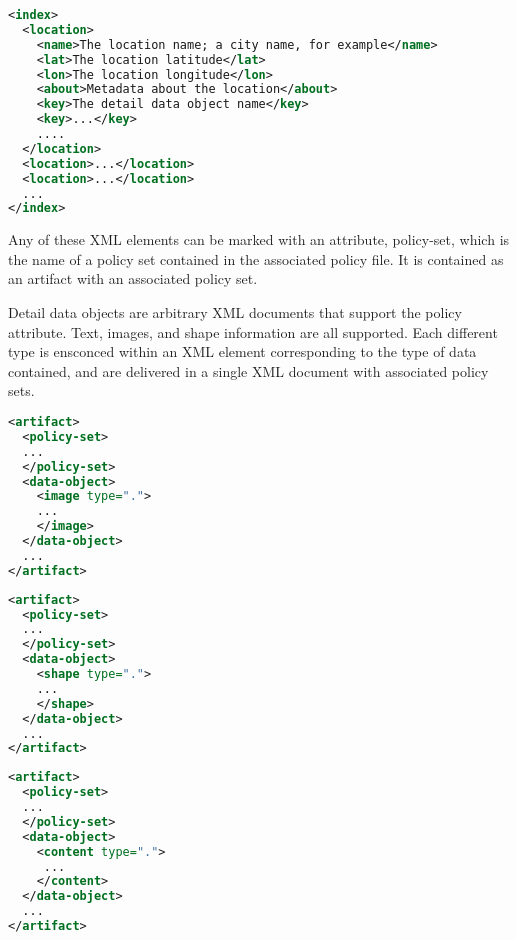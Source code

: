 \begin{lstlisting}[language=xml, label=lst:seed-data, caption=Seed Information for the Network]
<index>
  <location>
    <name>The location name; a city name, for example</name>
    <lat>The location latitude</lat>
    <lon>The location longitude</lon>
    <about>Metadata about the location</about>
    <key>The detail data object name</key>
    <key>...</key>
    ....
  </location>
  <location>...</location>
  <location>...</location>
  ...
</index>
\end{lstlisting}

Any of these XML elements can be marked with an attribute, policy-set, which is the name of a policy set contained in the associated policy file.  It is contained as an artifact with an associated policy set.

Detail data objects are arbitrary XML documents that support the policy attribute.  Text, images, and shape information are all supported.  Each different type is ensconced within an XML element corresponding to the type of data contained, and are delivered in a single XML document with associated policy sets.


\par\noindent
\begin{minipage}[t]{.30\textwidth}
\begin{lstlisting}[language=xml, label=lst:image-data, caption=Image]
<artifact>
  <policy-set>
  ...
  </policy-set>
  <data-object>
    <image type=".">
    ...
    </image>
  </data-object>
  ...
</artifact>
\end{lstlisting}
\end{minipage}
\hfill
\begin{minipage}[t]{.30\textwidth}
\begin{lstlisting}[language=xml, label=lst:shape-data, caption=Shape]
<artifact>
  <policy-set>
  ...
  </policy-set>
  <data-object>
    <shape type=".">
    ...
    </shape>
  </data-object>
  ...
</artifact>
\end{lstlisting}
\end{minipage}
\hfill
\begin{minipage}[t]{.30\textwidth}
\begin{lstlisting}[language=xml, label=lst:content-data, caption=Content]
<artifact>
  <policy-set>
  ...
  </policy-set>
  <data-object>
    <content type=".">
     ...
    </content>
  </data-object>
  ...
</artifact>
\end{lstlisting}
\end{minipage}

